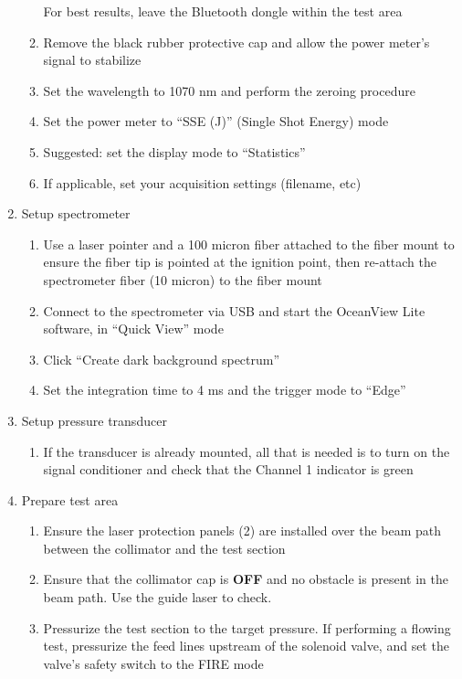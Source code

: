 \begin{enumerate}
\begin{enumerate}
    {\color{cyan} For best results, leave the Bluetooth dongle within the test area}
  \item
    Remove the black rubber protective cap and allow the power meter's
    signal to stabilize
  \item
    Set the wavelength to 1070 nm and perform the zeroing procedure
  \item
    Set the power meter to ``SSE (J)'' (Single Shot Energy) mode
  \item
    Suggested: set the display mode to ``Statistics''
  \item
    If applicable, set your acquisition settings (filename, etc)
  \end{enumerate}
\item
  Setup spectrometer

  \begin{enumerate}
  \def\labelenumii{\arabic{enumii}.}
  
  \item
    Use a laser pointer and a 100 micron fiber attached to the fiber
    mount to ensure the fiber tip is pointed at the ignition point, then
    re-attach the spectrometer fiber (10 micron) to the fiber mount
  \item
    Connect to the spectrometer via USB and start the OceanView Lite
    software, in ``Quick View'' mode
  \item
    Click ``Create dark background spectrum''
  \item
    Set the integration time to 4 ms and the trigger mode to ``Edge''
  \end{enumerate}
\item
  Setup pressure transducer

  \begin{enumerate}
  \def\labelenumii{\arabic{enumii}.}
  
  \item
    If the transducer is already mounted, all that is needed is to turn
    on the signal conditioner and check that the Channel 1 indicator is
    green
  \end{enumerate}
\item
  Prepare test area

  \begin{enumerate}
  \def\labelenumii{\arabic{enumii}.}
  \item
    Ensure the laser protection panels (2) are installed over the beam
    path between the collimator and the test section
  \item
    Ensure that the collimator cap is \textbf{OFF}
    and no obstacle is present in the beam path. Use the guide laser to
    check.
  \item
    Pressurize the test section to the target pressure. If performing a
    flowing test, pressurize the feed lines upstream of the solenoid
    valve, and set the valve's safety switch to the FIRE mode


\end{enumerate}
\end{enumerate}
